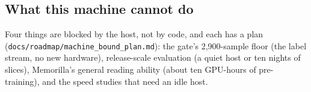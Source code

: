 \subsection{What this machine cannot do}

Four things are blocked by the host, not by code, and each has a plan (\texttt{docs/roadmap/machine\_bound\_plan.md}): the gate's 2,900-sample floor (the label
stream, no new hardware), release-scale evaluation (a quiet host or ten nights of slices), Memorilla's general reading ability (about ten GPU-hours of pre-training),
and the speed studies that need an idle host.
